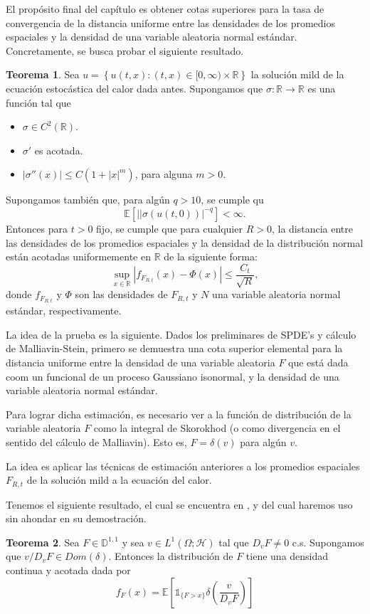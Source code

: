 \documentclass[letterpaper,twoside,12pt]{book}
\newcommand{\R}{\mathbb{R}}
\newcommand{\D}{\mathbb{D}}
\newcommand{\E}{\mathbb{E}}
\newcommand{\1}{\mathds{1}}
\newcommand{\abs}[1]{\left\lvert #1 \right\rvert}
\renewcommand{\to}{\rightarrow}
\theoremstyle{definition}
\theoremstyle{definition}
\newtheorem{teo}{Teorema}
\theoremstyle{definition}
\theoremstyle{definition}
\theoremstyle{definition}
\theoremstyle{definition}
\theoremstyle{definition}
\begin{document}
El propósito final del capítulo es obtener cotas superiores para la tasa de convergencia de la distancia uniforme entre las densidades de los promedios espaciales y la densidad de una variable aleatoria normal estándar. Concretamente, se busca probar el siguiente resultado.
\begin{teo} 
 Sea $u=\left\{u(t,x):(t,x)\in [0,\infty)\times\R\right\}$ la solución mild de la ecuación estocástica del calor dada antes. Supongamos que $\sigma:\R\to\R$ es una función tal que 
 \begin{itemize}
    \item $\sigma\in C^2(\R)$.
    \item $\sigma'$ es acotada.
    \item $\abs{\sigma''(x)}\leq C(1+\abs{x}^{m})$, \qquad para alguna $m>0$.
 \end{itemize}
 Supongamos también que, para algún $q>10$, se cumple qu 
 \[
 \E\left[\abs{|\sigma(u(t,0))}^{-q}\right]<\infty.    
 \]
 Entonces para $t>0$ fijo, se cumple que para cualquier $R>0$, la distancia entre las densidades de los promedios espaciales y la densidad de la distribución normal están acotadas uniformemente en $\R$ de la siguiente forma:
 \[
 \sup_{x\in \R} \abs{f_{F_{R,t}}(x)-\Phi(x)}\leq \frac{C_t}{\sqrt{R}},   
 \]
 donde $f_{F_{R,t}}$ y $\Phi$ son las densidades de $F_{R,t}$ y $N$ una variable aleatoria normal estándar, respectivamente.
 \end{teo}

 La idea de la prueba es la siguiente. Dados los preliminares de SPDE's y cálculo de Malliavin-Stein, primero se demuestra una cota superior elemental para la distancia uniforme entre la densidad de una variable aleatoria $F$ que está dada coom un funcional de un proceso Gaussiano isonormal, y la densidad de una variable aleatoria normal estándar.

 Para lograr dicha estimación, es necesario ver a la función de distribución de la variable aleatoria $F$ como la integral de Skorokhod (o como divergencia en el sentido del cálculo de Malliavin). Esto es, $F=\delta(v)$ para algún $v$.

La idea es aplicar las técnicas de estimación anteriores a los promedios espaciales $F_{R,t}$ de la solución mild a la ecuación del calor. 

Tenemos el siguiente resultado, el cual se encuentra en \cite{Caballero1998-hz}, y del cual haremos uso sin ahondar en su demostración.
\begin{teo} 
 Sea $F\in \D^{1,1}$ y  sea $v\in L^{1}(\Omega;\mathcal{H})$ tal que $D_vF\neq 0$ c.s. Supongamos que $v/D_vF\in Dom(\delta)$. Entonces la distribución de $F$ tiene una densidad continua y acotada dada por 
 \[
 f_F(x)=\E\left[\1_{\{F>x\}}\delta \left(\frac{v}{D_vF}\right)\right]   
 \]
 \end{teo}
\end{document}
